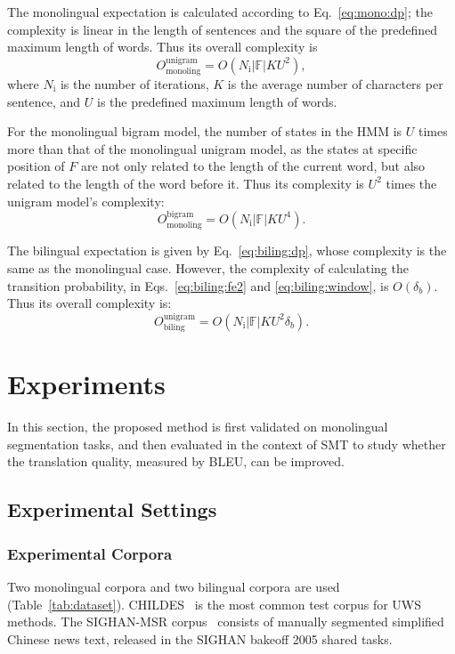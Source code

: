 \documentclass[11pt]{article}
\begin{document}
The monolingual expectation is calculated according to Eq.~\ref{eq:mono:dp}; the
complexity is linear in the length of sentences and the square of the
predefined maximum length of words. Thus its overall complexity is
\begin{equation}
O_{\textrm{monoling}}^{\textrm{unigram}}=O(N_{\textrm{i}} |\mathbb{F}| K U^2), \label{eq:complexity:monoUnigram}
\end{equation}
where $N_{\textrm{i}}$ is the number of iterations, $K$ is the average number of characters per sentence, and $U$ is the predefined maximum length of words.

For the monolingual bigram model, the number of states in the HMM  is
$U$ times  more than  that of the monolingual unigram model, as the
states at specific position of $F$ are not only related to the length of
the current word, but also related to the length of the word before it.
Thus its complexity is $U^2$ times the unigram model's complexity:
\begin{equation}
O_{\textrm{monoling}}^{\textrm{bigram}}=O(N_{\textrm{i}} |\mathbb{F}| K  U^4). \label{eq:complexity:monoBigram}
\end{equation}

The bilingual expectation  is given by Eq.~\ref{eq:biling:dp}, whose
complexity is the same as the monolingual case. However, the
complexity of calculating the transition probability, in
Eqs.~\ref{eq:biling:fe2} and \ref{eq:biling:window}, is $O(\delta_b)$.
Thus its overall complexity is:
\begin{equation}
O_{\textrm{biling}}^{\textrm{unigram}}=O(N_{\textrm{i}} |\mathbb{F}| K U^2 \delta_b). \label{eq:complexity:bilingUnigram}
\end{equation}

\section{Experiments}
In this section, the proposed method is first validated on
monolingual segmentation tasks, and then evaluated in the context of SMT to study whether
the translation quality, measured by BLEU, can be improved.

\subsection{Experimental Settings}

\subsubsection{Experimental Corpora}
Two monolingual corpora and two bilingual corpora are
used (Table~\ref{tab:dataset}). CHILDES~\cite{macwhinney1985child} 
is the most common test corpus for UWS methods. 
The SIGHAN-MSR corpus~\cite{emerson2005second} 
consists of manually segmented simplified Chinese news text, released in the SIGHAN bakeoff
2005 shared tasks. 
\end{document}
